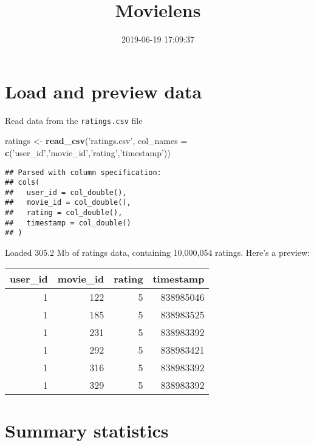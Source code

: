 \documentclass[]{article}
\title{Movielens}
\author{}
\date{2019-06-19 17:09:37}
\newenvironment{Shaded}{\begin{snugshade}}{\end{snugshade}}
\newcommand{\DataTypeTok}[1]{\textcolor[rgb]{0.13,0.29,0.53}{#1}}
\newcommand{\KeywordTok}[1]{\textcolor[rgb]{0.13,0.29,0.53}{\textbf{#1}}}
\newcommand{\NormalTok}[1]{#1}
\newcommand{\OperatorTok}[1]{\textcolor[rgb]{0.81,0.36,0.00}{\textbf{#1}}}
\newcommand{\StringTok}[1]{\textcolor[rgb]{0.31,0.60,0.02}{#1}}
\begin{document}
\maketitle

{
\setcounter{tocdepth}{3}
\tableofcontents
}
\hypertarget{load-and-preview-data}{%
\section{Load and preview data}\label{load-and-preview-data}}

Read data from the \texttt{ratings.csv} file

\begin{Shaded}
\begin{Highlighting}[]
\NormalTok{ratings <-}\StringTok{ }\KeywordTok{read_csv}\NormalTok{(}\StringTok{'ratings.csv'}\NormalTok{,}
                    \DataTypeTok{col_names =} \KeywordTok{c}\NormalTok{(}\StringTok{'user_id'}\NormalTok{,}\StringTok{'movie_id'}\NormalTok{,}\StringTok{'rating'}\NormalTok{,}\StringTok{'timestamp'}\NormalTok{))}
\end{Highlighting}
\end{Shaded}

\begin{verbatim}
## Parsed with column specification:
## cols(
##   user_id = col_double(),
##   movie_id = col_double(),
##   rating = col_double(),
##   timestamp = col_double()
## )
\end{verbatim}

Loaded 305.2 Mb of ratings data, containing 10,000,054 ratings. Here's a
preview:

\begin{Shaded}
\end{Shaded}

\begin{longtable}[]{@{}rrrr@{}}
\toprule
user\_id & movie\_id & rating & timestamp\tabularnewline
\midrule
\endhead
1 & 122 & 5 & 838985046\tabularnewline
1 & 185 & 5 & 838983525\tabularnewline
1 & 231 & 5 & 838983392\tabularnewline
1 & 292 & 5 & 838983421\tabularnewline
1 & 316 & 5 & 838983392\tabularnewline
1 & 329 & 5 & 838983392\tabularnewline
\bottomrule
\end{longtable}

\hypertarget{summary-statistics}{%
\section{Summary statistics}\label{summary-statistics}}
\end{document}
